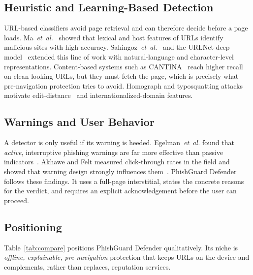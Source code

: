 \documentclass[conference]{IEEEtran}
\newcommand{\sys}{PhishGuard Defender}
\begin{document}
\subsection{Heuristic and Learning-Based Detection}
URL-based classifiers avoid page retrieval and can therefore decide before a
page loads. Ma~\emph{et~al.}~\cite{ma2009beyond} showed that lexical and host
features of URLs identify malicious sites with high accuracy.
Sahingoz~\emph{et~al.}~\cite{sahingoz2019} and the URLNet deep
model~\cite{le2018urlnet} extended this line of work with natural-language
and character-level representations. Content-based systems such as
CANTINA~\cite{zhang2007cantina} reach higher recall on clean-looking URLs, but
they must fetch the page, which is precisely what pre-navigation protection
tries to avoid. Homograph and typosquatting attacks~\cite{gabrilovich2002}
motivate edit-distance~\cite{levenshtein1966} and internationalized-domain
features.

\subsection{Warnings and User Behavior}
A detector is only useful if its warning is heeded. Egelman~\emph{et~al.}
found that \emph{active}, interruptive phishing warnings are far more
effective than passive indicators~\cite{egelman2008}. Akhawe and Felt
measured click-through rates in the field and showed that warning design
strongly influences them~\cite{akhawe2013}. \sys{} follows these findings. It
uses a full-page interstitial, states the concrete reasons for the verdict,
and requires an explicit acknowledgement before the user can proceed.

\subsection{Positioning}
Table~\ref{tab:compare} positions \sys{} qualitatively. Its niche is
\emph{offline, explainable, pre-navigation} protection that keeps URLs on the
device and complements, rather than replaces, reputation services.
\end{document}
